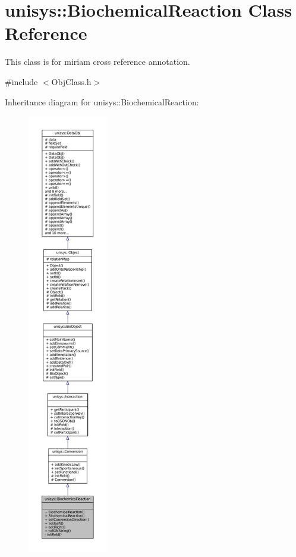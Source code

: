 \hypertarget{classunisys_1_1BiochemicalReaction}{\section{unisys\-:\-:Biochemical\-Reaction Class Reference}
\label{classunisys_1_1BiochemicalReaction}
}


This class is for miriam cross reference annotation.  




{\ttfamily \#include $<$Obj\-Class.\-h$>$}



Inheritance diagram for unisys\-:\-:Biochemical\-Reaction\-:
\nopagebreak
\begin{figure}[H]
\begin{center}
\leavevmode
\includegraphics[height=550pt]{classunisys_1_1BiochemicalReaction__inherit__graph}
\end{center}
\end{figure}


